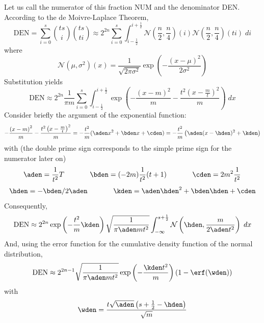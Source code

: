 \documentclass[phd,12pt,oneside]{ubcthesis}
\begin{document}
{\noindent}Let us call the numerator of this fraction NUM and the denominator
DEN. According to the de Moivre-Laplace Theorem,
\begin{equation}
  \label{eq:uumavael}
  \mbox{DEN}=\sum_{i=0}^{s}\binom{ts}{i}\binom{ts}{ti}\approx{}2^{2n}\sum_{i=0}^{s}\int_{i-\frac{1}{2}}^{i+\frac{1}{2}}\mathcal{N}(\frac{n}{2},\frac{n}{4})(i)\mathcal{N}(\frac{n}{2},\frac{n}{4})(ti)\;{}di
\end{equation}
where
\begin{equation}
  \label{eq:shiewain}
  \mathcal{N}(\mu,\sigma^{2})(x)=\frac{1}{\sqrt{2\pi\sigma^{2}}}\exp\left(-\frac{(x-\mu)^{2}}{2\sigma^{2}}\right)
\end{equation}
Substitution yields
\begin{equation}
  \label{eq:wahweele}
  \mbox{DEN}\approx{}2^{2n}\frac{1}{\pi{}m}\sum_{i=0}^{s}\int_{i-\frac{1}{2}}^{i+\frac{1}{2}}\exp\left(-\frac{\left(x-m\right)^{2}}{m}-\frac{t^{2}\left(x-\frac{m}{t}\right)^{2}}{m}\right)\;{}dx
\end{equation}
Consider briefly the argument of the exponential function:
\begin{equation}
  \label{eq:augahghu}
  -\frac{\left(x-m\right)^{2}}{m}-\frac{t^{2}\left(x-\frac{m}{t}\right)^{2}}{m}=-\frac{t^{2}}{m}({\aden}x^{2}+{\bden}x+{\cden})=-\frac{t^{2}}{m}\left({\aden}(x-{\hden})^{2}+{\kden}\right)
\end{equation}
with (the double prime sign corresponds to the simple prime sign for
the numerator later on)
\begin{equation}
  \label{eq:aiphueri}
{\aden}=\frac{1}{t^{2}}{T}\notag\hspace{.5in}
{\bden}=(-2m)\frac{1}{t^{2}}(t+1)\hspace{.5in}
{\cden}=2m^{2}\frac{1}{t^{2}}
\end{equation}
\begin{equation}
  \label{eq:quoseoth}
{\hden}=-{\bden}/2{\aden}\hspace{.5in}
{\kden}={\aden}{\hden}^{2}+{\bden}{\hden}+{\cden}
\end{equation}
Consequently,
\begin{equation}
  \label{eq:sheyupei}
\mbox{DEN}\approx{}2^{2n}\exp\left(-\frac{t^{2}}{m}{\kden}\right)\sqrt{\frac{1}{\pi{}{\aden}mt^{2}}}\int_{-\infty}^{s+\frac{1}{2}}\mathcal{N}\left({\hden},\frac{m}{2{\aden}t^{2}}\right)\;{}dx
\end{equation}
And, using the error function for the cumulative density function of
the normal distribution,
\begin{equation}
  \label{eq:den}
  \mbox{DEN}\approx{}2^{2n-1}\sqrt{\frac{1}{\pi{}{\aden}mt^{2}}}\exp\left(-\frac{{\kden}t^{2}}{m}\right)\left(1-\erf({\wden})\right)
\end{equation}
with
\begin{equation}
  \label{eq:beseituc}
  {\wden}=\frac{t\sqrt{{\aden}}\left(s+\frac{1}{2}-{\hden}\right)}{\sqrt{m}}
\end{equation}
\end{document}

